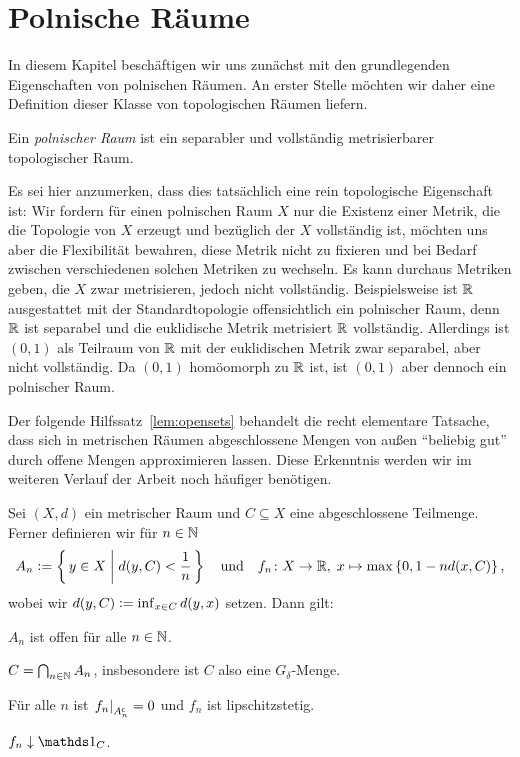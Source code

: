 \documentclass[../main/main.tex]{subfiles}
\begin{document}
	
	\section{Polnische Räume}
	
	In diesem Kapitel beschäftigen wir uns zunächst mit den grundlegenden Eigenschaften von polnischen Räumen. 
	An erster Stelle möchten wir daher eine Definition dieser Klasse von topologischen Räumen liefern.
	
	\begin{Definition}
		Ein \emph{polnischer Raum} ist ein separabler und vollständig metrisierbarer topologischer Raum.
	\end{Definition}

	Es sei hier anzumerken, dass dies tatsächlich eine rein topologische Eigenschaft ist: Wir fordern für einen polnischen Raum $X$ nur die Existenz einer Metrik,
	die die Topologie von $X$ erzeugt und bezüglich der $X$ vollständig ist, möchten uns aber die Flexibilität
	bewahren, diese Metrik nicht zu fixieren und bei Bedarf zwischen verschiedenen solchen Metriken
	zu wechseln. Es kann durchaus Metriken geben, die $X$ zwar metrisieren, jedoch nicht vollständig.
	Beispielsweise ist $\mathbb{R}$ ausgestattet mit der Standardtopologie offensichtlich ein polnischer Raum,
	denn $\mathbb{R}$ ist separabel und die euklidische Metrik metrisiert $\mathbb{R}$ vollständig. 
	Allerdings ist $(0, 1)$ als Teilraum von $\mathbb{R}$ mit der euklidischen Metrik zwar separabel, aber nicht vollständig.
	Da $(0, 1)$ homöomorph zu $\mathbb{R}$ ist, ist $(0, 1)$ aber dennoch ein polnischer Raum.

	Der folgende Hilfssatz~\ref{lem:opensets} behandelt die recht elementare Tatsache, dass sich in metrischen Räumen 
	abgeschlossene Mengen von außen \enquote{beliebig gut} durch offene Mengen approximieren lassen. 
	Diese Erkenntnis werden wir im weiteren Verlauf der Arbeit noch häufiger benötigen.
	
	\begin{Hilfssatz}
		\label{lem:opensets}
		Sei $(X, d)$ ein metrischer Raum und $C \subseteq X$ eine abgeschlossene 
		Teilmenge. Ferner definieren wir für $n \in \mathbb{N}$
		$$ A_n \vcentcolon = \left\{\, y \in X \; \middle| \; d(y, C) < \frac{1}{n} \,\right\} \quad \text{und} \quad 
		f_n \colon X \to \mathbb{R}, \; x \mapsto \max \left\{0, 1-n d(x, C)\right\}  \text{,}$$
		wobei wir $d(y, C) \vcentcolon = \inf_{x \in C} d(y, x)$ setzen.
		Dann gilt:
		\begin{enumeratethm}
			\item $A_n$ ist offen für alle $n \in \mathbb{N}$.
			\item $C = \bigcap_{n \in \mathbb{N}} A_n$, insbesondere ist $C$ also eine $G_\delta$-Menge.
			\item Für alle $n$ ist $\left.f_n\right|_{A_n^\mathsf{c}} = 0$ und $f_n$ ist lipschitzstetig.
			\item $f_n \convdown \indfct_C$.
		\end{enumeratethm}
	\end{Hilfssatz}
	
\end{document}
